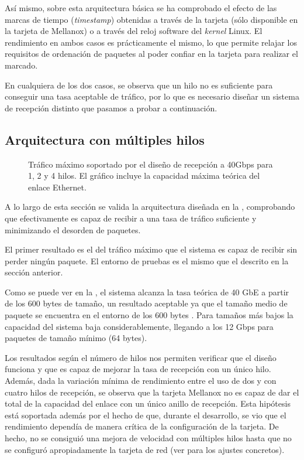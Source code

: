 \documentclass[twoside, 12pt]{epstfg}
\begin{document}
Así mismo, sobre esta arquitectura básica se ha comprobado el efecto de las marcas de tiempo (\textit{timestamp}) obtenidas a través de la tarjeta (sólo disponible en la tarjeta de Mellanox) o a través del reloj software del \textit{kernel} Linux. El rendimiento en ambos casos es prácticamente el mismo, lo que permite relajar los requisitos de ordenación de paquetes al poder confiar en la tarjeta para realizar el marcado.

En cualquiera de los dos casos, se observa que un hilo no es suficiente para conseguir una tasa aceptable de tráfico, por lo que es necesario diseñar un sistema de recepción distinto que pasamos a probar a continuación.

\subsection{Arquitectura con múltiples hilos}

\begin{figure}[hbtp]
\caption[Capacidad del diseño de recepción a 40 Gbps]{Tráfico máximo soportado por el diseño de recepción a 40Gbps para 1, 2 y 4 hilos. El gráfico incluye la capacidad máxima teórica del enlace Ethernet.}
\label{fig:Validacion:MulticoreMaxRate}
\end{figure}

A lo largo de esta sección se valida la arquitectura diseñada en la , comprobando que efectivamente es capaz de recibir a una tasa de tráfico suficiente y minimizando el desorden de paquetes.

El primer resultado es el del tráfico máximo que el sistema es capaz de recibir sin perder ningún paquete. El entorno de pruebas es el mismo que el descrito en la sección anterior.

Como se puede ver en la , el sistema alcanza la tasa teórica de 40 GbE a partir de los 600 bytes de tamaño, un resultado aceptable ya que el tamaño medio de paquete se encuentra en el entorno de los 600 bytes \cite{john2007analysis}. Para tamaños más bajos la capacidad del sistema baja considerablemente, llegando a los 12 Gbps para paquetes de tamaño mínimo (64 bytes).

Los resultados según el número de hilos nos permiten verificar que el diseño funciona y que es capaz de mejorar la tasa de recepción con un único hilo. Además, dada la variación mínima de rendimiento entre el uso de dos y con cuatro hilos de recepción, se observa que la tarjeta Mellanox no es capaz de dar el total de la capacidad del enlace con un único anillo de recepción. Esta hipótesis está soportada además por el hecho de que, durante el desarrollo, se vio que el rendimiento dependía de manera crítica de la configuración de la tarjeta. De hecho, no se consiguió una mejora de velocidad con múltiples hilos hasta que no se configuró apropiadamente la tarjeta de red (ver  para los ajustes concretos).
\end{document}

